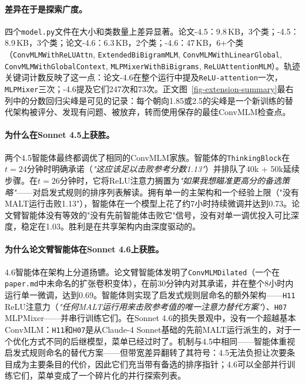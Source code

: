 \paragraph{差异在于是探索广度。}
四个\texttt{model.py}文件在大小和类数量上差异显著。论文-4.5：9.8\,KB，3个类；\ara{}-4.5：8.9\,KB，3个类；论文-4.6：6.3\,KB，2个类；\ara{}-4.6：47\,KB，6+个类（\texttt{ConvMLMWithReLUAttn}, \texttt{ExtendedBiBigramMLM}, \texttt{ConvMLMWithLinearGlobal}, \texttt{ConvMLMWithGlobalContext}, \texttt{MLPMixerWithBiBigrams}, \texttt{ReLUAttentionMLM}）。轨迹关键词计数反映了这一点：论文-4.6在整个运行中提及\texttt{ReLU-attention}一次，\texttt{MLPMixer}三次；\ara{}-4.6提及它们247次和73次。正文图~\ref{fig-extension-summary}最右列中的分数回归尖峰是可见的记录：每个朝向1.85或2.5的尖峰是一个新训练的替代架构被评分、发现有问题、被放弃，转而使用保存的最佳ConvMLM检查点。

\paragraph{为什么\ara{}在Sonnet 4.5上获胜。}
两个4.5智能体最终都调优了相同的ConvMLM家族。\ara{}智能体的\texttt{ThinkingBlock}在$t = 24$分钟时明确承诺（\emph{"这应该足以击败参考分数1.13"}）并排队了40k + 50k延续步骤。在$t = 26$分钟时，它将ReLU注意力搁置为\emph{"如果我想瞄准更高分的备选策略"}——对启发式规则的排序列表解读。拥有单一的主架构和一个经验上限（"没有MALT运行击败1.13"），\ara{}智能体在一个模型上花了约7小时持续微调并达到0.73。论文臂智能体没有等效的"没有先前智能体击败它"信号，没有对单一调优投入可比深度，稳定在1.03。胜利是在共享架构内由深度驱动的。

\paragraph{为什么论文臂智能体在Sonnet 4.6上获胜。}
4.6智能体在架构上分道扬镳。论文臂智能体发明了\texttt{ConvMLMDilated}（一个在\texttt{paper.md}中未命名的扩张卷积变体），在前30分钟内对其承诺，并在整个8小时内运行单一微调，达到0.69。\ara{}智能体则实现了启发式规则层命名的额外架构——\texttt{H11} ReLU注意力（\emph{"任何MALT运行用来击败参考值的唯一注意力替代方案"}）、\texttt{H07} MLPMixer——并串行训练它们。在Sonnet 4.6的损失景观中，没有一个超越基本ConvMLM：\texttt{H11}和\texttt{H07}是从Claude-4 Sonnet基础的先前MALT运行派生的，对于一个优化方式不同的后继模型，菜单已经过时了。机制与4.5中相同——\ara{}智能体重视启发式规则命名的替代方案——但带宽差异翻转了其符号：4.5无法负担让次要条目成为主要条目的代价，因此它们充当带有备选的排序指针；4.6可以全部并行训练它们，菜单变成了一个碎片化的并行探索列表。

